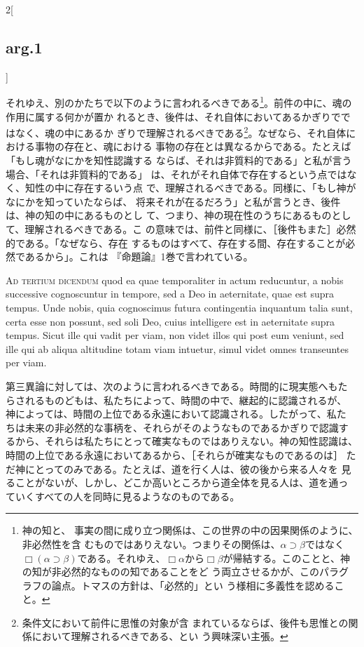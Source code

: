 \documentclass[paper=a4paper,fontsize=10pt,jafontsize=9pt,titlepage]{jlreq}
\begin{document}
\begin{paracol}{2}[\subsection{arg.1}]
\switchcolumn

それゆえ、別のかたちで以下のように言われるべきである\footnote{神の知と、
事実の間に成り立つ関係は、この世界の中の因果関係のように、非必然性を含
むものではありえない。つまりその関係は、$\alpha \supset \beta$ではなく
$\Box(\alpha \supset \beta)$である。それゆえ、$\Box \alpha$から$\Box
\beta$が帰結する。このことと、神の知が非必然的なものの知であることをど
う両立させるかが、このパラグラフの論点。トマスの方針は、「必然的」とい
う様相に多義性を認めること。}。前件の中に、魂の作用に属する何かが置か
れるとき、後件は、それ自体においてあるかぎりでではなく、魂の中にあるか
ぎりで理解されるべきである\footnote{条件文において前件に思惟の対象が含
まれているならば、後件も思惟との関係において理解されるべきである、とい
う興味深い主張。}。なぜなら、それ自体における事物の存在と、魂における
事物の存在とは異なるからである。たとえば「もし魂がなにかを知性認識する
ならば、それは非質料的である」と私が言う場合、「それは非質料的である」
は、それがそれ自体で存在するという点ではなく、知性の中に存在するいう点
で、理解されるべきである。同様に、「もし神がなにかを知っていたならば、
将来それが在るだろう」と私が言うとき、後件は、神の知の中にあるものとし
て、つまり、神の現在性のうちにあるものとして、理解されるべきである。こ
の意味では、前件と同様に、［後件もまた］必然的である。「なぜなら、存在
するものはすべて、存在する間、存在することが必然であるから」。これは
『命題論』1巻で言われている。

\switchcolumn*[\subsection{ad.3}]

{\scshape Ad tertium dicendum} quod ea quae temporaliter in actum
reducuntur, a nobis successive cognoscuntur in tempore, sed a Deo in
aeternitate, quae est supra tempus. Unde nobis, quia cognoscimus
futura contingentia inquantum talia sunt, certa esse non possunt, sed
soli Deo, cuius intelligere est in aeternitate supra tempus. Sicut
ille qui vadit per viam, non videt illos qui post eum veniunt, sed
ille qui ab aliqua altitudine totam viam intuetur, simul videt omnes
transeuntes per viam.

\switchcolumn

第三異論に対しては、次のように言われるべきである。時間的に現実態へもた
らされるものどもは、私たちによって、時間の中で、継起的に認識されるが、
神によっては、時間の上位である永遠において認識される。したがって、私た
ちは未来の非必然的な事柄を、それらがそのようなものであるかぎりで認識す
るから、それらは私たちにとって確実なものではありえない。神の知性認識は、
時間の上位である永遠においてあるから、［それらが確実なものであるのは］
ただ神にとってのみである。たとえば、道を行く人は、彼の後から来る人々を
見ることがないが、しかし、どこか高いところから道全体を見る人は、道を通っ
ていくすべての人を同時に見るようなのものである。


\end{paracol}
\end{document}
